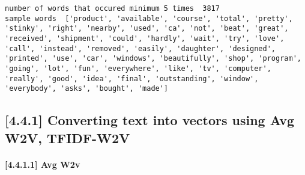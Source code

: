 \documentclass[11pt]{article}
\begin{document}
    \begin{Verbatim}[commandchars=\\\{\}]
number of words that occured minimum 5 times  3817
sample words  ['product', 'available', 'course', 'total', 'pretty', 'stinky', 'right', 'nearby', 'used', 'ca', 'not', 'beat', 'great', 'received', 'shipment', 'could', 'hardly', 'wait', 'try', 'love', 'call', 'instead', 'removed', 'easily', 'daughter', 'designed', 'printed', 'use', 'car', 'windows', 'beautifully', 'shop', 'program', 'going', 'lot', 'fun', 'everywhere', 'like', 'tv', 'computer', 'really', 'good', 'idea', 'final', 'outstanding', 'window', 'everybody', 'asks', 'bought', 'made']

    \end{Verbatim}

    \subsection{{[}4.4.1{]} Converting text into vectors using Avg W2V,
TFIDF-W2V}\label{converting-text-into-vectors-using-avg-w2v-tfidf-w2v}

    \paragraph{{[}4.4.1.1{]} Avg W2v}\label{avg-w2v}
\end{document}
